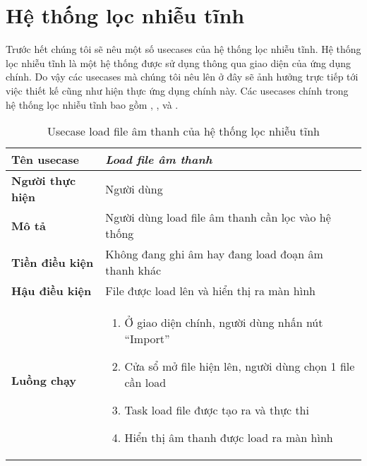 	\section{Hệ thống lọc nhiễu tĩnh}
		
		Trước hết chúng tôi sẽ nêu một số usecases của hệ thống lọc nhiễu tĩnh. Hệ thống lọc nhiễu tĩnh là một hệ thống được sử dụng thông qua giao diện của ứng dụng chính. Do vậy các usecases mà chúng tôi nêu lên ở đây sẽ ảnh hưởng trực tiếp tới việc thiết kế cũng như hiện thực ứng dụng chính này. Các usecases chính trong hệ thống lọc nhiễu tĩnh bao gồm , ,  và .
			
			\begin{table}[h]
				\centering
				\renewcommand{\tablename}{Usecase}
				\begin{tabular}{p{35mm} p{90mm}}
					\hline
					\textbf{Tên usecase}		& \textit{Load file âm thanh} \\
					\hline
					\textbf{Người thực hiện}	& Người dùng \\
					\textbf{Mô tả}				& Người dùng load file âm thanh cần lọc vào hệ thống \\
					\textbf{Tiền điều kiện} 	& Không đang ghi âm hay đang load đoạn âm thanh khác \\
					\textbf{Hậu điều kiện}		& File được load lên và hiển thị ra màn hình \\
					\textbf{Luồng chạy}			& 	\begin{enumerate}[1.]
														\item Ở giao diện chính, người dùng nhấn nút ``Import''
														\item Cửa sổ mở file hiện lên, người dùng chọn 1 file cần load
														\item Task load file được tạo ra và thực thi
														\item Hiển thị âm thanh được load ra màn hình
													\end{enumerate}	\\
					\hline
				\end{tabular}
			\caption{Usecase load file âm thanh của hệ thống lọc nhiễu tĩnh}
			\label{design::static_usecase_1}
			\end{table}
		
